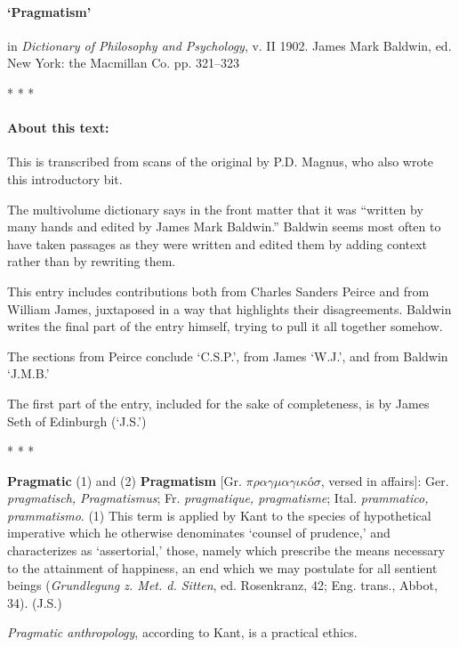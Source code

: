 \documentclass{article}
\newcommand{\spacer}{\medskip\centerline{* * *}\medskip}
\begin{document}
\paragraph{`Pragmatism'} in \emph{Dictionary of Philosophy and Psychology}, v. II 1902. James Mark Baldwin, ed. New York: the Macmillan Co. pp. 321--323

\spacer

\paragraph{About this text:} This is transcribed from scans of the original by P.D. Magnus, who also wrote this introductory bit.

The multivolume dictionary says in the front matter that it was ``written by many hands and edited by James Mark Baldwin.'' Baldwin seems most often to have taken passages as they were written and edited them by adding context rather than by rewriting them.

This entry includes contributions both from Charles Sanders Peirce and from William James, juxtaposed in a way that highlights their disagreements. Baldwin writes the final part of the entry himself, trying to pull it all together somehow.

The sections from Peirce conclude `C.S.P.', from James `W.J.', and from Baldwin `J.M.B.'

The first part of the entry, included for the sake of completeness, is by James Seth of Edinburgh (`J.S.')


\spacer







\textbf{Pragmatic} (1) and (2) \textbf{Pragmatism} [Gr. $\pi\rho\alpha\gamma\mu\alpha\gamma\iota\kappa$\'{o}$\sigma$, versed in affairs]: Ger. \textit{pragmatisch, Pragmatismus}; Fr. \textit{pragmatique, pragmatisme}; Ital. \textit{prammatico, prammatismo}. (1) This term is applied by Kant to the species of hypothetical imperative which he otherwise denominates `counsel of prudence,' and characterizes as `assertorial,' those, namely which prescribe the means necessary to the attainment of happiness, an end which we may postulate for all sentient beings (\textit{Grundlegung z. Met. d. Sitten}, ed. Rosenkranz, 42; Eng. trans., Abbot, 34). \hfill (J.S.)

\textit{Pragmatic anthropology}, according to Kant, is a practical ethics.
\end{document}
